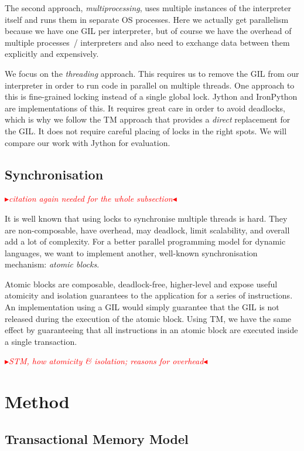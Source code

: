 \documentclass{sigplanconf}
\newcommand{\mynote}[2]{%
  \textcolor{red}{%
    \fbox{\bfseries\sffamily\scriptsize#1}%
    {\small$\blacktriangleright$\textsf{\emph{#2}}$\blacktriangleleft$}%
  }%
}
\newcommand\remi[1]{\mynote{Remi}{#1}}
\newcommand\cfbolz[1]{\mynote{cfbolz}{#1}}
\begin{document}
The second approach, \emph{multiprocessing}, uses multiple instances
of the interpreter itself and runs them in separate OS processes.
Here we actually get parallelism because we have one GIL per
interpreter, but of course we have the overhead of multiple processes~/
interpreters and also need to exchange data between them explicitly
and expensively.

We focus on the \emph{threading} approach. This requires us to remove
the GIL from our interpreter in order to run code in parallel on
multiple threads. One approach to this is fine-grained locking instead
of a single global lock. Jython and IronPython are implementations of
this. It requires great care in order to avoid deadlocks, which is why
we follow the TM approach that provides a \emph{direct} replacement
for the GIL. It does not require careful placing of locks in the right
spots. We will compare our work with Jython for evaluation.


\subsection{Synchronisation}

\cfbolz{citation again needed for the whole subsection}

It is well known that using locks to synchronise multiple threads is
hard. They are non-composable, have overhead, may deadlock, limit
scalability, and overall add a lot of complexity. For a better
parallel programming model for dynamic languages, we want to implement
another, well-known synchronisation mechanism: \emph{atomic blocks}.

Atomic blocks are composable, deadlock-free, higher-level and expose
useful atomicity and isolation guarantees to the application for a
series of instructions. An implementation using a GIL would simply
guarantee that the GIL is not released during the execution of the
atomic block. Using TM, we have the same effect by guaranteeing that
all instructions in an atomic block are executed inside a single
transaction.


\remi{STM, how atomicity \& isolation; reasons for overhead}


\section{Method}

\subsection{Transactional Memory Model}
\end{document}
